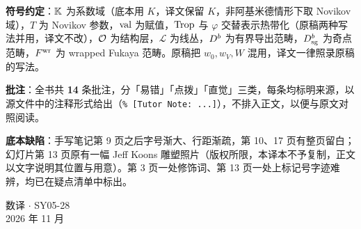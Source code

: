 \textbf{符号约定}：$\mathbb{K}$ 为系数域（底本用 $K$，译文保留 $K$，非阿基米德情形下取 Novikov 域），$T$ 为 Novikov 参数，$\operatorname{val}$ 为赋值，$\operatorname{Trop}$ 与 $\varphi$ 交替表示热带化（原稿两种写法并用，译文不改），$\mathcal{O}$ 为结构层，$\mathcal L$ 为线丛，$D^{b}$ 为有界导出范畴，$D^{b}_{\mathrm{sg}}$ 为奇点范畴，$F^{\mathrm{wr}}$ 为 wrapped Fukaya 范畴。原稿把 $w_0,w_V,W$ 混用，译文一律照录原稿的写法。

\textbf{批注}：全书共 \textbf{14} 条批注，分「易错」「点拨」「直觉」三类，每条均标明来源，以源文件中的注释形式给出（\texttt{\% [Tutor Note: ...]}），不排入正文，以便与原文对照阅读。

\textbf{底本缺陷}：手写笔记第 9 页之后字号渐大、行距渐疏，第 10、17 页有整页留白；幻灯片第 13 页原有一幅 Jeff Koons 雕塑照片（版权所限，本译本不予复制，正文以文字说明其位置与用意）。第 3 页一处修饰词、第 13 页一处上标记号字迹难辨，均已在疑点清单中标出。

\begin{flushright}
数译 $\cdot$ SY05-28\\
2026 年 11 月
\end{flushright}

\newpage
\tableofcontents
\newpage
